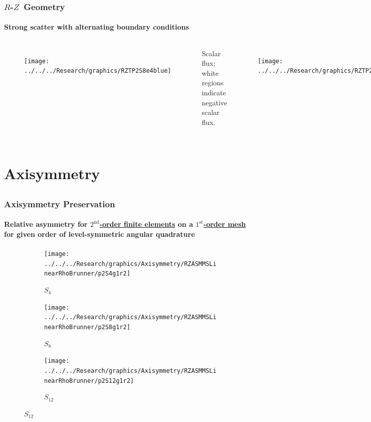 \documentclass[compress,t]{beamer}
\newcommand{\RZ}{$R$-$Z$}
\begin{document}
\begin{frame}
\frametitle{\RZ\ Geometry}
\framesubtitle{Strong scatter with alternating boundary conditions}

\vspace{-10pt}

\begin{columns}[T]
\begin{figure}
\texttt{[image: ../../../Research/graphics/RZTP2S8e4blue]}
\end{figure}

\vspace{-10pt}
\centering
\footnotesize{Scalar flux; white regions indicate negative scalar flux.}


\begin{figure}
\texttt{[image: ../../../Research/graphics/RZTP2S8e4logblue]}
\end{figure}

\vspace{-10pt}
\centering
\footnotesize{Log of scalar flux; white regions indicate negative scalar flux.}
\end{columns}

\end{frame}

\section{Axisymmetry}
\subsection{}

\begin{frame}
\frametitle{Axisymmetry Preservation}
\framesubtitle{Relative asymmetry for \underline{$2^\text{nd}$-order finite elements} on a \underline{$1^\text{st}$-order mesh} for given order of level-symmetric angular quadrature}

\begin{figure}
\centering
\begin{subfigure}{0.33\textwidth}
\centering
\texttt{[image: ../../../Research/graphics/Axisymmetry/RZASMMSLinearRhoBrunner/p2S4g1r2]}
\caption{$S_4$}
\end{subfigure}%
\begin{subfigure}{0.33\textwidth}
\centering
\texttt{[image: ../../../Research/graphics/Axisymmetry/RZASMMSLinearRhoBrunner/p2S8g1r2]}
\caption{$S_8$}
\end{subfigure}%
\begin{subfigure}{0.33\textwidth}
\centering
\texttt{[image: ../../../Research/graphics/Axisymmetry/RZASMMSLinearRhoBrunner/p2S12g1r2]}
\caption{$S_{12}$}
\end{subfigure}
\end{figure}

\end{frame}
\end{document}
